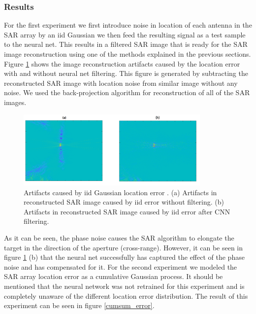 \documentclass{article}
\begin{document}
\subsubsection{Results}
\indent \indent
For the first experiment we first introduce noise in location of each antenna in the SAR array by an iid Gaussian we then feed the resulting signal as a test sample to the neural net. This results in a filtered SAR image that is ready for the SAR image reconstruction using one of the methods explained in the previous sections. Figure \ref{iid_error} shows the image reconstruction artifacts caused by the location error with and without neural net filtering. This figure is generated by subtracting the reconstructed SAR image with location noise from similar image without any noise. We used the back-projection algorithm for reconstruction of all of the SAR images. 
\begin{figure}[h!]
    \centering
    \includegraphics[width=0.845\textwidth]{Figures/linear_nn_vs_no_nn.png}
\caption{Artifacts caused by iid Gaussian location error . (a) Artifacts in reconstructed SAR image caused by iid error without filtering. (b) Artifacts in reconstructed SAR image caused by iid error after CNN filtering.}
\label{iid_error}
\end{figure}
\newline
\indent
As it can be seen, the phase noise causes the SAR algorithm to elongate the target in the direction of the aperture (cross-range). However, it can be seen in figure \ref{iid_error} (b) that the neural net successfully has captured the effect of the phase noise and has compensated for it.
For the second experiment we modeled the SAR array location error as a cumulative Gaussian process. It should be mentioned that the neural network was not retrained for this experiment and is completely unaware of the different location error distribution. The result of this experiment can be seen in figure \ref{cumsum_error}.
\end{document}
